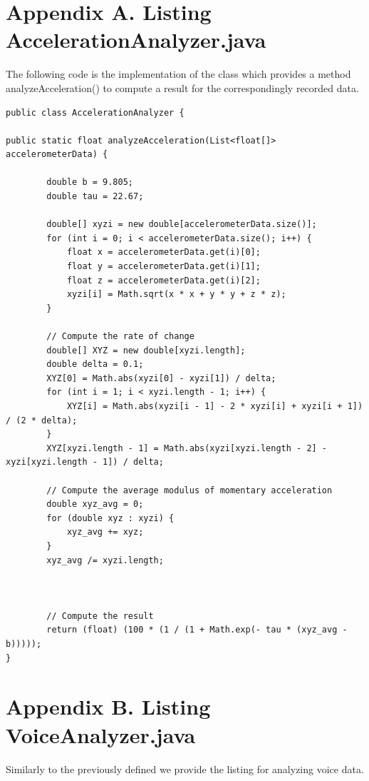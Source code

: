\documentclass[12pt,a4paper]{article}
\begin{document}
\newpage

\section*{Appendix A. Listing AccelerationAnalyzer.java}

The following code is the implementation of the class which provides a method analyzeAcceleration() to compute a result for the correspondingly recorded data.

\vspace{5mm}

\begin{lstlisting}
public class AccelerationAnalyzer {

public static float analyzeAcceleration(List<float[]> accelerometerData) {

        double b = 9.805;
        double tau = 22.67;

        double[] xyzi = new double[accelerometerData.size()];
        for (int i = 0; i < accelerometerData.size(); i++) {
            float x = accelerometerData.get(i)[0];
            float y = accelerometerData.get(i)[1];
            float z = accelerometerData.get(i)[2];
            xyzi[i] = Math.sqrt(x * x + y * y + z * z);
        }

        // Compute the rate of change
        double[] XYZ = new double[xyzi.length];
        double delta = 0.1;
        XYZ[0] = Math.abs(xyzi[0] - xyzi[1]) / delta;
        for (int i = 1; i < xyzi.length - 1; i++) {
            XYZ[i] = Math.abs(xyzi[i - 1] - 2 * xyzi[i] + xyzi[i + 1]) / (2 * delta);
        }
        XYZ[xyzi.length - 1] = Math.abs(xyzi[xyzi.length - 2] - xyzi[xyzi.length - 1]) / delta;

        // Compute the average modulus of momentary acceleration
        double xyz_avg = 0;
        for (double xyz : xyzi) {
            xyz_avg += xyz;
        }
        xyz_avg /= xyzi.length;



        // Compute the result
        return (float) (100 * (1 / (1 + Math.exp(- tau * (xyz_avg - b)))));
}
\end{lstlisting}

\newpage

\section*{Appendix B. Listing VoiceAnalyzer.java}

Similarly to the previously defined we provide the listing for analyzing voice data.
\end{document}
